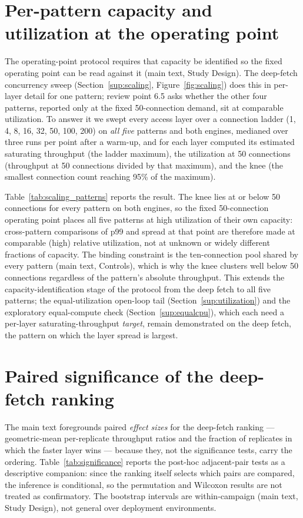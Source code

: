 \documentclass[11pt,a4paper]{article}
\newcommand{\tabledir}{tables/}
\begin{document}


\section{Per-pattern capacity and utilization at the operating point}
\label{sup:scaling-patterns}
The operating-point protocol requires that capacity be identified so the fixed operating point can be
read against it (main text, Study Design). The deep-fetch concurrency sweep
(Section~\ref{sup:scaling}, Figure~\ref{fig:scaling}) does this in per-layer detail for one pattern;
review point 6.5 asks whether the other four patterns, reported only at the fixed 50-connection
demand, sit at comparable utilization. To answer it we swept every access layer over a connection
ladder (1, 4, 8, 16, 32, 50, 100, 200) on \emph{all five} patterns and both engines, medianed over
three runs per point after a warm-up, and for each layer computed its estimated saturating throughput (the ladder
maximum), the utilization at 50 connections (throughput at 50 connections divided by that maximum),
and the knee (the smallest connection count reaching 95\% of the maximum).

Table~\ref{tab:scaling_patterns} reports the result. The knee lies at or below 50 connections for
every pattern on both engines, so the fixed 50-connection operating point places all five patterns at
high utilization of their own capacity: cross-pattern comparisons of p99 and spread at that point are
therefore made at comparable (high) relative utilization, not at unknown or widely different
fractions of capacity. The binding constraint is the ten-connection pool shared by every pattern
(main text, Controls), which is why the knee clusters well below 50 connections regardless of the
pattern's absolute throughput. This extends the capacity-identification stage of the protocol from
the deep fetch to all five patterns; the equal-utilization open-loop tail
(Section~\ref{sup:utilization}) and the exploratory equal-compute check (Section~\ref{sup:equalcpu}),
which each need a per-layer saturating-throughput \emph{target}, remain demonstrated on the deep
fetch, the pattern on which the layer spread is largest.



\section{Paired significance of the deep-fetch ranking}
\label{sup:significance-deep}
The main text foregrounds paired \emph{effect sizes} for the deep-fetch ranking --- geometric-mean
per-replicate throughput ratios and the fraction of replicates in which the faster layer wins ---
because they, not the significance tests, carry the ordering. Table~\ref{tab:significance} reports the
post-hoc adjacent-pair tests as a descriptive companion: since the ranking itself selects which pairs
are compared, the inference is conditional, so the permutation and Wilcoxon results are not treated as
confirmatory. The bootstrap intervals are within-campaign (main text, Study Design), not general over
deployment environments.
\end{document}

